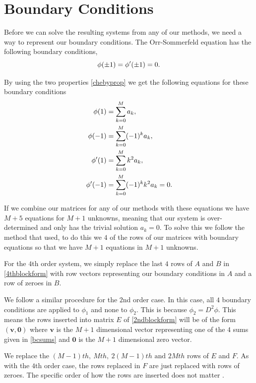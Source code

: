 \section{Boundary Conditions} \label{section:bc}
Before we can solve the resulting systems from any of our methods, we need a way to represent our boundary conditions. The Orr-Sommerfeld equation has the following boundary conditions, 
\begin{equation}
    \phi(\pm 1) = \phi'(\pm 1) = 0.
\end{equation}

By using the two properties \eqref{chebyprop} we get the following equations for these boundary conditions
\begin{align}
    \phi(1) &=\sum^M_{k=0} a_k, \\
    \phi(-1) &= \sum^M_{k=0} (-1)^k a_k, \\
    \phi'(1) &= \sum^M_{k=0} k^2 a_k, \\
    \phi'(-1) &= \sum^M_{k=0} (-1)^k k^2 a_k = 0.
    \label{bcsums}
\end{align}

If we combine our matrices for any of our methods with these equations we have $ M + 5 $ equations for $ M + 1 $ unknowns, meaning that our system is over-determined and only has the trivial solution $ a_k = 0 $. To solve this we follow the method that \cite{orszag1971accurate} used, to do this we $ 4 $ of the rows of our matrices with boundary equations so that we have $ M + 1 $ equations in $ M + 1 $ unknowns.

For the $4$th order system, we simply replace the last $4$ rows of $ A $ and $B$ in \eqref{4thblockform} with row vectors representing our boundary conditions in $A$ and a row of zeroes in $B$.

We follow a similar procedure for the $2$nd order case. In this case, all $4$ boundary conditions are applied to $\phi_1$ and none to $ \phi_2 $. This is because $\phi_2 = D^2 \phi $. This means the rows inserted into matrix $E$ of \eqref{2ndblockform} will be of the form $ (\mathbf{v}, \mathbf{0})$ where $ \mathbf{v}$ is the $ M+1 $ dimensional vector representing one of the $4$ sums given in \eqref{bcsums} and $\mathbf{0} $ is the $ M +1 $ dimensional zero vector. 

We replace the $ (M - 1)th,\ Mth,\ 2(M-1)th \text{ and } 2Mth$ rows of $E$ and $F$. As with the $4$th order case, the rows replaced in $F$ are just replaced with rows of zeroes. The specific order of how the rows are inserted does not matter \citep{bukhari1997spectral}.

